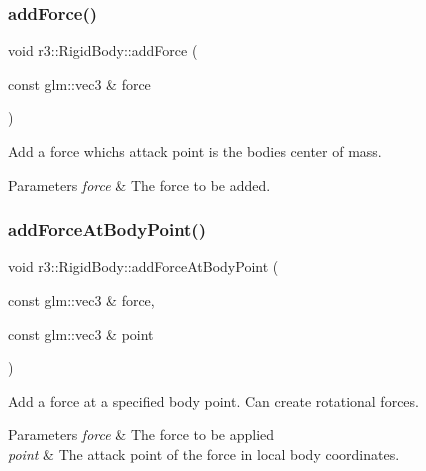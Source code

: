 \subsubsection{\texorpdfstring{add\+Force()}{addForce()}}
{\footnotesize\ttfamily void r3\+::\+Rigid\+Body\+::add\+Force (\begin{DoxyParamCaption}\item[{const glm\+::vec3 \&}]{force }\end{DoxyParamCaption})}



Add a force which\textquotesingle{}s attack point is the bodies center of mass. 


\begin{DoxyParams}{Parameters}
{\em force} & The force to be added. \\
\hline
\end{DoxyParams}
\mbox{\label{classr3_1_1_rigid_body_abba1067c4db2d246e3f82b6c1bd35c87}} 
\subsubsection{\texorpdfstring{add\+Force\+At\+Body\+Point()}{addForceAtBodyPoint()}}
{\footnotesize\ttfamily void r3\+::\+Rigid\+Body\+::add\+Force\+At\+Body\+Point (\begin{DoxyParamCaption}\item[{const glm\+::vec3 \&}]{force,  }\item[{const glm\+::vec3 \&}]{point }\end{DoxyParamCaption})}



Add a force at a specified body point. Can create rotational forces. 


\begin{DoxyParams}{Parameters}
{\em force} & The force to be applied \\
\hline
{\em point} & The attack point of the force in local body coordinates. \\
\hline
\end{DoxyParams}
\mbox{\label{classr3_1_1_rigid_body_a9e8fc5409e15ae0184baf3238b97dec7}} 
